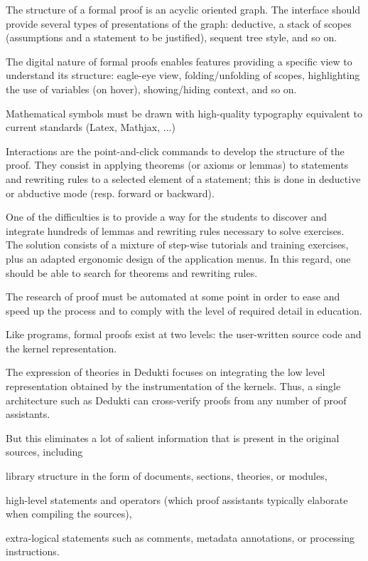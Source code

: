 The structure of a formal proof is an acyclic oriented graph.
The interface should provide several types of presentations of the graph:
deductive, a stack of scopes (assumptions and a statement to be justified),
sequent tree style, and so on.

The digital nature of formal proofs enables features providing a specific
view
to understand its structure: eagle-eye view, folding/unfolding of
scopes, highlighting the use of variables (on hover), showing/hiding
context, and so on.

Mathematical symbols must be drawn with high-quality typography equivalent
to current standards (Latex, Mathjax, ...)

Interactions are the point-and-click commands to develop the structure
of the proof. They consist in applying theorems (or axioms or lemmas)
to statements and rewriting rules to a selected element of a
statement; this is done in deductive or abductive mode (resp. forward
or backward).

One of the difficulties is to provide a way for the students to discover
and integrate hundreds of lemmas and rewriting rules necessary to solve
exercises. The solution consists of a mixture of step-wise tutorials and
training exercises, plus an adapted ergonomic design of the application menus.
In this regard, one should be able to search for theorems and rewriting rules.

The research of proof must be automated at some point in order to ease and
speed up the process and to comply with the level of required detail in education.


Like programs, formal proofs exist at two levels: the user-written
source code and the kernel representation.

The expression of theories in Dedukti focuses on integrating the low
level representation obtained by the instrumentation of the kernels.  Thus, a
single architecture such as Dedukti can cross-verify proofs from any
number of proof assistants.

But this eliminates a lot of salient information that is present in
the original sources, including
\begin{compactitem}
\item library structure in the form of documents, sections,
  theories, or modules,
\item high-level statements and operators (which proof assistants
  typically elaborate when compiling the sources),
\item extra-logical statements such as comments, metadata annotations,
  or processing instructions.
\end{compactitem}

